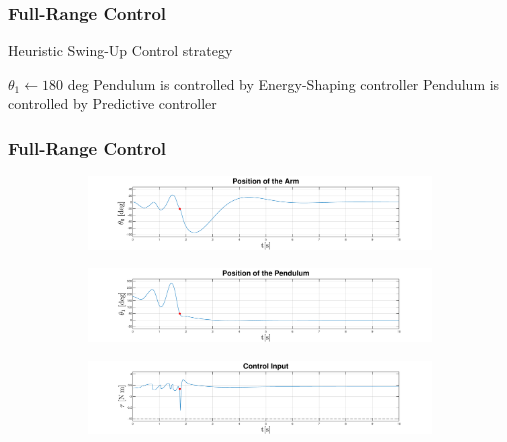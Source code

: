 \documentclass[]{beamer}
\begin{document}
\begin{frame}
	\frametitle{Full-Range Control}	
	\begin{algorithm}[H]
		\caption{Heuristic Swing-Up Control strategy}
		\begin{algorithmic}[1]
			\State $\theta_1 \gets 180$ deg
			\State Pendulum is controlled by Energy-Shaping controller
			\State Pendulum is controlled by Predictive controller
			\EndIf
			\EndProcedure	
		\end{algorithmic}
	\end{algorithm}	
\end{frame}

\begin{frame}
	\frametitle{Full-Range Control}	
	\begin{figure}[H]
		\centering
		\begin{subfigure}
			\centering
			\includegraphics[scale=0.25]{images/Hswing/arm.pdf}  
		\end{subfigure}
		\begin{subfigure}
			\centering
			\includegraphics[scale=0.25]{images/Hswing/pend.pdf}  
		\end{subfigure}
		\begin{subfigure}
			\centering
			\includegraphics[scale=0.25]{images/Hswing/control.pdf} 
		\end{subfigure}
	\end{figure}
\end{frame}
\end{document}
